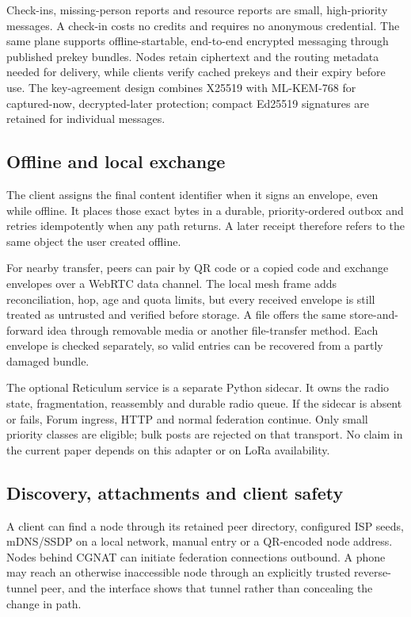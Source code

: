\documentclass[12pt,a4paper]{article}
\begin{document}
Check-ins, missing-person reports and resource reports are small, high-priority messages. A check-in costs no credits and requires no anonymous credential. The same plane supports offline-startable, end-to-end encrypted messaging through published prekey bundles. Nodes retain ciphertext and the routing metadata needed for delivery, while clients verify cached prekeys and their expiry before use. The key-agreement design combines X25519 with ML-KEM-768 for captured-now, decrypted-later protection; compact Ed25519 signatures are retained for individual messages.

\subsection*{Offline and local exchange}
The client assigns the final content identifier when it signs an envelope, even while offline. It places those exact bytes in a durable, priority-ordered outbox and retries idempotently when any path returns. A later receipt therefore refers to the same object the user created offline.

For nearby transfer, peers can pair by QR code or a copied code and exchange envelopes over a WebRTC data channel. The local mesh frame adds reconciliation, hop, age and quota limits, but every received envelope is still treated as untrusted and verified before storage. A \texttt{} file offers the same store-and-forward idea through removable media or another file-transfer method. Each envelope is checked separately, so valid entries can be recovered from a partly damaged bundle.

The optional Reticulum service is a separate Python sidecar. It owns the radio state, fragmentation, reassembly and durable radio queue. If the sidecar is absent or fails, Forum ingress, HTTP and normal federation continue. Only small priority classes are eligible; bulk posts are rejected on that transport. No claim in the current paper depends on this adapter or on LoRa availability.

\subsection*{Discovery, attachments and client safety}
A client can find a node through its retained peer directory, configured ISP seeds, mDNS/SSDP on a local network, manual entry or a QR-encoded node address. Nodes behind CGNAT can initiate federation connections outbound. A phone may reach an otherwise inaccessible node through an explicitly trusted reverse-tunnel peer, and the interface shows that tunnel rather than concealing the change in path.
\end{document}
